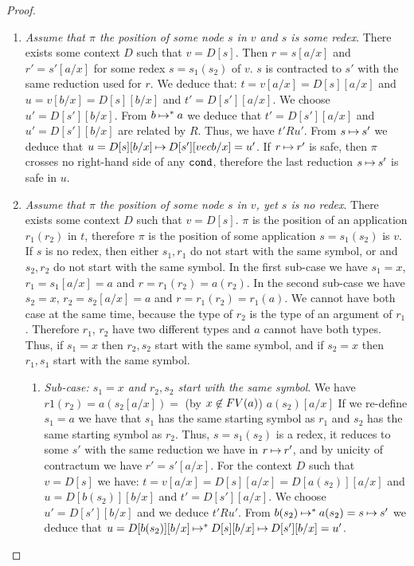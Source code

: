 \begin{proof}
\begin{enumerate}
\item
\emph{Assume that $\pi$ the position of some node $s$ in 
$v$ and \emph{$s$ is some redex}}.  
There exists some context $D$ such that $v = D[s]$. Then $r=s[a/x]$
and $r'=s'[a/x]$ for some redex $s=s_1(s_2)$ of $v$.
$s$ is contracted to $s'$ with the same reduction used for $r$.
We deduce that:
$ t  = v[a/x] = D[s][a/x]$ and 
$ u = v[b/x] = D[s][b/x]$ and
$ t' = D[s'][a/x]$. 
We choose $u' = D[s'][b/x]$. 
From $b \mathbin{\mapsto}^{*} a$ we deduce that
$t' = D[s'][a/x]$ and 
$u' = D[s'][b/x]$ are related by $R$.
Thus, we have $t' R u'$. From  $s \mathbin{\mapsto}   s'$ we deduce that 
$
u = D[s][b/x]
\mathbin{\mapsto}   
D[s'][vec{b}/x] = u'
$.
If $r \mathbin{\mapsto} r'$ is safe, then 
$\pi$ crosses no right-hand side of any ${\tt cond}$, therefore the last reduction
$s \mathbin{\mapsto} s'$ is safe in $u$.


\item
\emph{Assume that $\pi$ the position of some node $s$ in 
$v$,  yet \emph{$s$ is no redex}}.  
There exists some context $D$ such that $v = D[s]$. 
$\pi$ is the position of an application $r_1(r_2)$ in $t$, therefore
$\pi$ is the position of some application $s = s_1(s_2)$ is $v$.
If $s$ is no redex, then either $s_1, r_1$ do not start with the same symbol,
or and $s_2, r_2$ do not start with the same symbol. In the first sub-case
we have $s_1=x$, $r_1 = s_1[a/x] = a$ and $r = r_1(r_2) = a(r_2)$.
In the second sub-case
we have $s_2=x$, $r_2 = s_2[a/x] = a$ and $r = r_1(r_2) = r_1(a)$.
We cannot have both case at the same time, 
because the type of $r_2$ is the type of an argument of $r_1$. 
Therefore $r_1$, $r_2$ have two different types and $a$ cannot have both types.
Thus, if $s_1=x$ then $r_2,s_2$ start with the same symbol, and if
$s_2=x$ then $r_1,s_1$ start with the same symbol.

\begin{enumerate}
\item
\emph{Sub-case: $s_1=x$ and $r_2,s_2$ start with the same symbol}. 
We have $r1(r_2) = a(s_2[a/x]) = $ (by $x \not \in {{\relax FV}}(a)$) $ a(s_2)[a/x]$ 
If we re-define $s_1=a$ we have that $s_1$ has the same starting symbol
as $r_1$ and $s_2$ has the same starting symbol as $r_2$.
Thus, $s = s_1(s_2)$ is a redex, it reduces to some $s'$ with the same reduction
we have in $r \mathbin{\mapsto} r'$, and by unicity of contractum we have $r' = s'[a/x]$.
For the context $D$ such that $v=D[s]$
we have: 
$ t  = v[a/x] = D[s][a/x] = D[a(s_2)][a/x]$ and 
$ u = D[b(s_2)][b/x] $ and
$ t' = D[s'][a/x]$. 
We choose $u' = D[s'][b/x]$ 
and we deduce $t' R u'$. 
From $b(s_2) \mathbin{\mapsto}^{*} a(s_2) = s \mathbin{\mapsto}   s'$
we deduce that $u = D[b(s_2)][b/x] \mathbin{\mapsto}^{*} 
D[s][b/x] \mathbin{\mapsto} D[s'][b/x] = u'$.


\end{enumerate}
\end{enumerate}
\end{proof}
